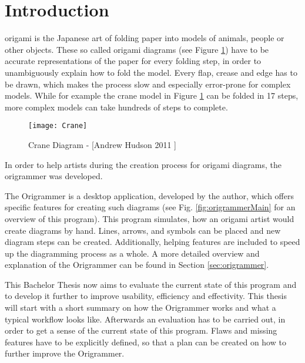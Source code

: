 
\section{Introduction}
\label{sec:introduction}

\gls{origami} is the Japanese art of folding paper into models of animals, people or other objects. These so called origami diagrams (see Figure \ref{fig:craneDiagram}) have to be accurate representations of the paper for every folding step, in order to unambiguously explain how to fold the model. Every flap, crease and edge has to be drawn, which makes the process slow and especially error-prone for complex models. While for example the crane model in Figure \ref{fig:craneDiagram} can be folded in 17 steps, more complex models can take hundreds of steps to complete. 

\begin{figure}[htbp]
	\centering
	\texttt{[image: Crane]}
	\caption[Crane Diagram]{Crane Diagram - [Andrew Hudson 2011 \cite{Hudson}]}
	\label{fig:craneDiagram}
\end{figure}

In order to help artists during the creation process for origami diagrams, the \gls{origrammer} \cite{origrammer} was developed.

The Origrammer is a desktop application, developed by the author, which offers specific features for creating such diagrams (see Fig. \ref{fig:origrammerMain} for an overview of this program). This program simulates, how an origami artist would create diagrams by hand. Lines, arrows, and symbols can be placed and new diagram steps can be created. Additionally, helping features are included to speed up the diagramming process as a whole. A more detailed overview and explanation of the Origrammer can be found in Section \ref{sec:origrammer}. %

This Bachelor Thesis now aims to evaluate the current state of this program and to develop it further to improve usability, efficiency and effectivity. This thesis will start with a short summary on how the Origrammer works and what a typical workflow looks like. Afterwards an evaluation has to be carried out, in order to get a sense of the current state of this program. Flaws and missing features have to be explicitly defined, so that a plan can be created on how to further improve the Origrammer.

